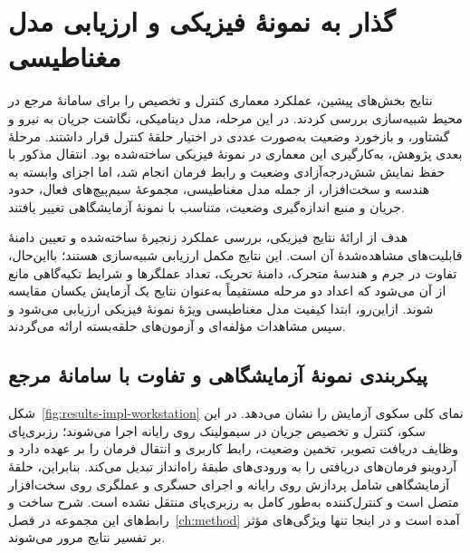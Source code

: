 
\section{گذار به نمونهٔ فیزیکی و ارزیابی مدل مغناطیسی}
\label{sec:results-impl-model}

نتایج بخش‌های پیشین، عملکرد معماری کنترل و تخصیص را برای سامانهٔ مرجع در محیط شبیه‌سازی بررسی کردند. در این مرحله، مدل دینامیکی، نگاشت جریان به نیرو و گشتاور، و بازخورد وضعیت به‌صورت عددی در اختیار حلقهٔ کنترل قرار داشتند. مرحلهٔ بعدی پژوهش، به‌کارگیری این معماری در نمونهٔ فیزیکی ساخته‌شده بود. انتقال مذکور با حفظ نمایش شش‌درجه‌آزادی وضعیت و رابط فرمان انجام شد، اما اجزای وابسته به هندسه و سخت‌افزار، از جمله مدل مغناطیسی، مجموعهٔ سیم‌پیچ‌های فعال، حدود جریان و منبع اندازه‌گیری وضعیت، متناسب با نمونهٔ آزمایشگاهی تغییر یافتند.

هدف از ارائهٔ نتایج فیزیکی، بررسی عملکرد زنجیرهٔ ساخته‌شده و تعیین دامنهٔ قابلیت‌های مشاهده‌شدهٔ آن است. این نتایج مکمل ارزیابی شبیه‌سازی هستند؛ بااین‌حال، تفاوت در جرم و هندسهٔ متحرک، دامنهٔ تحریک، تعداد عملگرها و شرایط تکیه‌گاهی مانع از آن می‌شود که اعداد دو مرحله مستقیماً به‌عنوان نتایج یک آزمایش یکسان مقایسه شوند. ازاین‌رو، ابتدا کیفیت مدل مغناطیسی ویژهٔ نمونهٔ فیزیکی ارزیابی می‌شود و سپس مشاهدات مؤلفه‌ای و آزمون‌های حلقه‌بسته ارائه می‌گردند.

\subsection{پیکربندی نمونهٔ آزمایشگاهی و تفاوت با سامانهٔ مرجع}
\label{subsec:results-impl-configuration}

شکل~\ref{fig:results-impl-workstation} نمای کلی سکوی آزمایش را نشان می‌دهد. در این سکو، کنترل و تخصیص جریان در سیمولینک روی رایانه اجرا می‌شوند؛ رزبری‌پای وظایف دریافت تصویر، تخمین وضعیت، رابط کاربری و انتقال فرمان را بر عهده دارد و آردوینو فرمان‌های دریافتی را به ورودی‌های طبقهٔ راه‌انداز تبدیل می‌کند. بنابراین، حلقهٔ آزمایشگاهی شامل پردازش روی رایانه و اجرای حسگری و عملگری روی سخت‌افزار متصل است و کنترل‌کننده به‌طور کامل به رزبری‌پای منتقل نشده است. شرح ساخت و رابط‌های این مجموعه در فصل~\ref{ch:method} آمده است و در اینجا تنها ویژگی‌های مؤثر بر تفسیر نتایج مرور می‌شوند.

